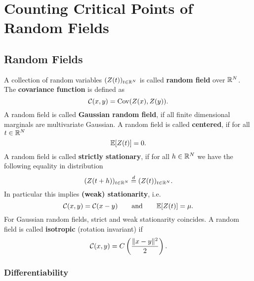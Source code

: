 \section{Counting Critical Points of Random Fields}

\subsection{Random Fields}

\begin{definition}
	A collection of random variables \((Z(t))_{t\in\mathbb{R}^N}\) is called
	\textbf{random field} over \(\mathbb{R}^N\). The \textbf{covariance function}
	is defined as
	\begin{equation*}
		\mathcal{C}(x,y) = \operatorname{Cov}(Z(x), Z(y)).
	\end{equation*}
	A random field is called \textbf{Gaussian random field}, if all finite
	dimensional marginals are multivariate Gaussian.
	A random field is called \textbf{centered}, if for all \(t\in\mathbb{R}^N\)
	\[
		\mathbb{E}[Z(t)] = 0.
	\]
	A random field is called \textbf{strictly stationary}, if for all
	\(h\in\mathbb{R}^N\) we have the following equality in distribution
	\[
		(Z(t+h))_{t\in\mathbb{R}^N} \overset{d}= (Z(t))_{t\in\mathbb{R}^N}.
	\]
	In particular this implies	\textbf{(weak) stationarity}, i.e.
	\begin{equation*}
		\mathcal{C}(x,y) = \mathcal{C}(x-y)\qquad \text{and} \qquad \mathbb{E}[Z(t)]=\mu.
	\end{equation*}
	For Gaussian random fields, strict and weak stationarity coincides.
	A random field is called \textbf{isotropic} (rotation invariant) if	
	\begin{equation*}
		\mathcal{C}(x,y) = C\left(\frac{\|x-y\|^2}{2}\right).
	\end{equation*}
\end{definition}

\subsubsection{Differentiability}

